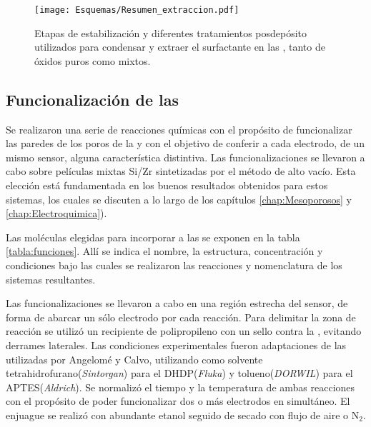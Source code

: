 				\begin{figure}[ht!]
						  \begin{center}
						  \texttt{[image: Esquemas/Resumen\_extraccion.pdf]}
						  \caption[Tratamientos pos-depósito de \pdm]{Etapas de estabilización y diferentes tratamientos posdepósito utilizados para condensar y extraer el surfactante en las \pdm, tanto de óxidos puros como mixtos.}
						  \label{esq:peliculas_meso_tratamientos}
						  \end{center}
						  \end{figure}
    \vspace*{-0.3cm}
	\subsection{Funcionalización de las \pdm}
	
		Se realizaron una serie de reacciones químicas con el propósito de funcionalizar las paredes de los poros de la \pdm\space y con el objetivo de conferir a cada electrodo, de un mismo sensor, alguna característica distintiva. Las funcionalizaciones se llevaron a cabo sobre películas mixtas Si/Zr sintetizadas por el método de alto vacío. Esta elección está fundamentada en los buenos resultados obtenidos para estos sistemas, los cuales se discuten a lo largo de los capítulos \ref{chap:Mesoporosos} y \ref{chap:Electroquimica}).

		Las moléculas elegidas para incorporar a las \pdmZ\space se exponen en la tabla \ref{tabla:funciones}. Allí se indica el nombre, la estructura, concentración y condiciones bajo las cuales se realizaron las reacciones y nomenclatura de los sistemas resultantes.

		Las funcionalizaciones se llevaron a cabo en una región estrecha del sensor, de forma de abarcar un sólo electrodo por cada reacción. Para delimitar la zona de reacción se utilizó un recipiente de polipropileno con un sello contra la \pdm, evitando derrames laterales. Las condiciones experimentales fueron adaptaciones de las utilizadas por Angelomé\cite{Angelome2008} y Calvo\cite{Calvo20210}, utilizando como solvente tetrahidrofurano(\textit{Sintorgan}) para el DHDP(\textit{Fluka}) y tolueno(\textit{DORWIL}) para el APTES(\textit{Aldrich}). Se normalizó el tiempo y la temperatura de ambas reacciones con el propósito de poder funcionalizar dos o más electrodos en simultáneo. El enjuague se realizó con abundante etanol seguido de secado con flujo de aire o N$_2$.

